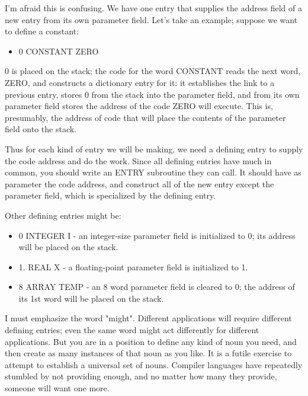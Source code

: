 \documentclass[b5paper, oneside]{book}
\begin{document}
I'm afraid this is confusing. We have one entry that supplies the address field of a new entry from its own parameter field. Let's take an example; suppose we want to define a constant:\begin{itemize}
   \item 0 CONSTANT ZERO\end{itemize}
0 is placed on the stack; the code for the word CONSTANT reads the next word, ZERO, and constructs a dictionary entry for it: it establishes the link to a previous entry, stores 0 from the stack into the parameter field, and from its own parameter field stores the address of the code ZERO will execute. This is, presumably, the address of code that will place the contents of the parameter field onto the stack.

Thus for each kind of entry we will be making, we need a defining entry to supply the code address and do the work. Since all defining entries have much in common, you should write an ENTRY subroutine they can call. It should have as parameter the code address, and construct all of the new entry except the parameter field, which is specialized by the defining entry.

Other defining entries might be:\begin{itemize}
   \item 0 INTEGER I - an integer-size parameter field is initialized to 0; its address will be placed on the stack.
   \item 1. REAL X - a floating-point parameter field is initialized to 1.
   \item 8 ARRAY TEMP - an 8 word parameter field is cleared to 0; the address of its 1st word will be placed on the stack.\end{itemize}
I must emphasize the word "might". Different applications will require different defining entries; even the same word might act differently for different applications. But you are in a position to define any kind of noun you need, and then create as many instances of that noun as you like. It is a futile exercise to attempt to establish a universal set of nouns. Compiler languages have repeatedly stumbled by not providing enough, and no matter how many they provide, someone will want one more.
\end{document}
